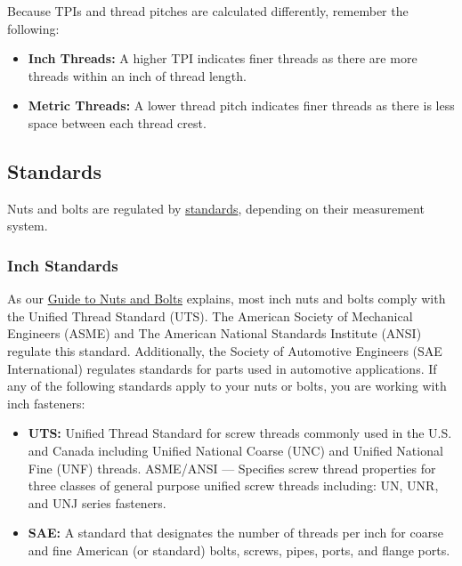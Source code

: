 \documentclass[12pt, a4paper]{article}
\providecommand{\tightlist}{%
	\setlength{\itemsep}{0pt}\setlength{\parskip}{0pt}}
\providecommand{\tightlist}{%
	\setlength{\itemsep}{0pt}\setlength{\parskip}{0pt}}
\begin{document}
		\hypertarget{iivm5l}{}
		Because TPIs and thread pitches are calculated differently, remember the
		following:
		
		\begin{itemize}
			\tightlist
			\item
			\textbf{Inch Threads:} A higher TPI indicates finer threads as there
			are more threads within an inch of thread length.
			\item
			\textbf{Metric Threads:} A lower thread pitch indicates finer threads
			as there is less space between each thread crest.
		\end{itemize}
		
		\hypertarget{ibnyqd}{%
			\subsection{Standards}\label{ibnyqd}}
		
		\hypertarget{icngzy}{}
		Nuts and bolts are regulated by
		\href{https://www.huyett.com/blog-why-are-standards-important}{standards},
		depending on their measurement system.
		
		\hypertarget{iibhbc}{%
			\subsubsection{Inch Standards}\label{iibhbc}}
		
		\hypertarget{i9sheb}{}
		As our \href{https://www.huyett.com/blog-nuts-and-bolts}{Guide to Nuts
			and Bolts} explains, most inch nuts and bolts comply with the Unified
		Thread Standard (UTS). The American Society of Mechanical Engineers
		(ASME) and The American National Standards Institute (ANSI) regulate
		this standard. Additionally, the Society of Automotive Engineers (SAE
		International) regulates standards for parts used in automotive
		applications. If any of the following standards apply to your nuts or
		bolts, you are working with inch fasteners:
		
		\begin{itemize}
			\tightlist
			\item
			\textbf{UTS:} Unified Thread Standard for screw threads commonly used
			in the U.S. and Canada including Unified National Coarse (UNC) and
			Unified National Fine (UNF) threads. ASME/ANSI --- Specifies screw
			thread properties for three classes of general purpose unified screw
			threads including: UN, UNR, and UNJ series fasteners.
			\item
			\textbf{SAE:} A standard that designates the number of threads per
			inch for coarse and fine American (or standard) bolts, screws, pipes,
			ports, and flange ports.
		\end{itemize}
		
\end{document}
